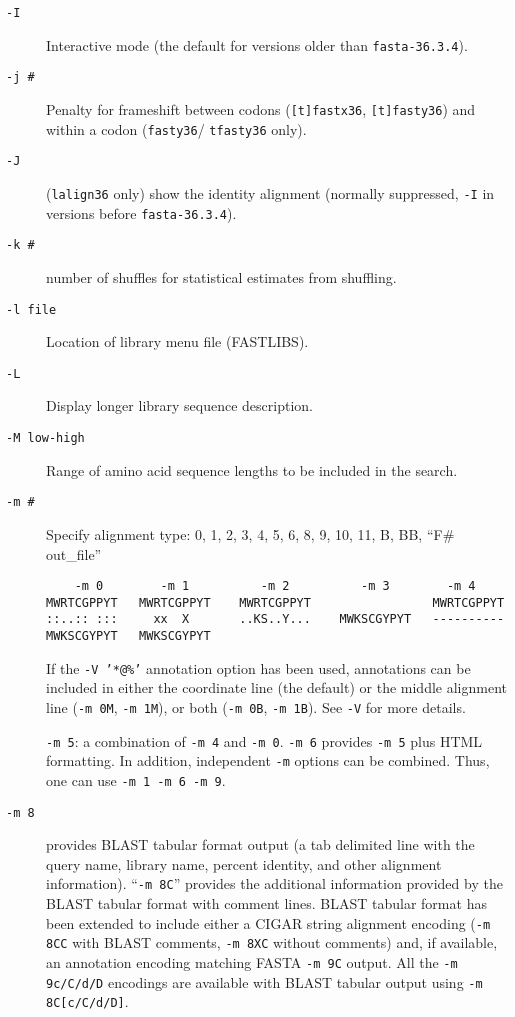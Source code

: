 \documentclass[11pt]{article}
\begin{document}
\begin{description}
\item[\texttt{-I}]
Interactive mode (the default for versions older than \texttt{fasta-36.3.4}).
\item[\texttt{-j \#}]
Penalty for frameshift between codons (\texttt{[t]fastx36}, \texttt{[t]fasty36}) and within a codon (\texttt{fasty36}/ \texttt{tfasty36} only).
\item[\texttt{-J}]
(\texttt{lalign36} only) show the identity alignment (normally
  suppressed, \texttt{-I} in versions before \texttt{fasta-36.3.4}).
\item[\texttt{-k \#}]
number of shuffles for statistical estimates from shuffling.
\item[\texttt{-l file}]
Location of library menu file (FASTLIBS).
\item[\texttt{-L}]
Display longer library sequence description.
\item[\texttt{-M low-high}]
Range of amino acid sequence lengths to be included in the search.
\item[\texttt{-m \#}]
Specify alignment type: 0, 1, 2, 3, 4, 5, 6, 8, 9, 10, 11, B, BB, ``F\# out\_file''
\begin{small}
\begin{verbatim}
    -m 0        -m 1          -m 2          -m 3        -m 4
MWRTCGPPYT   MWRTCGPPYT    MWRTCGPPYT                 MWRTCGPPYT
::..:: :::     xx  X       ..KS..Y...    MWKSCGYPYT   ----------
MWKSCGYPYT   MWKSCGYPYT
\end{verbatim}
\end{small}
If the \texttt{-V '*@\%'} annotation option has been used, 
annotations can be included in either the coordinate line (the default) or the
middle alignment line (\texttt{-m 0M}, \texttt{-m 1M}), or both
(\texttt{-m 0B}, \texttt{-m 1B}).  See \texttt{-V} for more details.

\indent \texttt{-m 5}: a combination of \texttt{-m 4} and \texttt{-m
  0}. \texttt{-m 6} provides \texttt{-m 5} plus HTML formatting.  In
addition, independent \texttt{-m} options can be combined. Thus, one
can use \texttt{-m 1 -m 6 -m 9}.

\item[\texttt{-m 8}] provides BLAST tabular format output (a tab
  delimited line with the query name, library name, percent identity,
  and other alignment information). ``\texttt{-m 8C}'' provides the
  additional information provided by the BLAST tabular format with
  comment lines.  BLAST tabular format has been extended to include
  either a CIGAR string alignment encoding (\texttt{-m 8CC} with BLAST
  comments, \texttt{-m 8XC} without comments) and, if available, an
  annotation encoding matching FASTA \texttt{-m 9C} output. All the
  \texttt{-m 9c/C/d/D} encodings are available with BLAST tabular
  output using \texttt{-m 8C[c/C/d/D]}.


\end{description}
\end{document}
